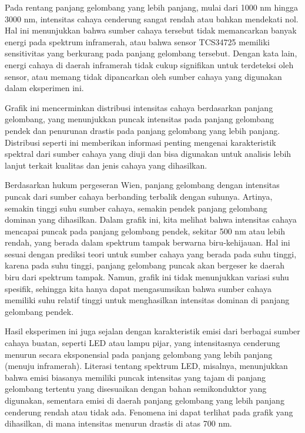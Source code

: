 Pada rentang panjang gelombang yang lebih panjang, mulai dari 1000 nm hingga 3000 nm, intensitas cahaya cenderung sangat rendah atau bahkan mendekati nol. Hal ini menunjukkan bahwa sumber cahaya tersebut tidak memancarkan banyak energi pada spektrum inframerah, atau bahwa sensor TCS34725 memiliki sensitivitas yang berkurang pada panjang gelombang tersebut. Dengan kata lain, energi cahaya di daerah inframerah tidak cukup signifikan untuk terdeteksi oleh sensor, atau memang tidak dipancarkan oleh sumber cahaya yang digunakan dalam eksperimen ini.

Grafik ini mencerminkan distribusi intensitas cahaya berdasarkan panjang gelombang, yang menunjukkan puncak intensitas pada panjang gelombang pendek dan penurunan drastis pada panjang gelombang yang lebih panjang. Distribusi seperti ini memberikan informasi penting mengenai karakteristik spektral dari sumber cahaya yang diuji dan bisa digunakan untuk analisis lebih lanjut terkait kualitas dan jenis cahaya yang dihasilkan.

Berdasarkan hukum pergeseran Wien, panjang gelombang dengan intensitas puncak dari sumber cahaya berbanding terbalik dengan suhunya. Artinya, semakin tinggi suhu sumber cahaya, semakin pendek panjang gelombang dominan yang dihasilkan. Dalam grafik ini, kita melihat bahwa intensitas cahaya mencapai puncak pada panjang gelombang pendek, sekitar 500 nm atau lebih rendah, yang berada dalam spektrum tampak berwarna biru-kehijauan. Hal ini sesuai dengan prediksi teori untuk sumber cahaya yang berada pada suhu tinggi, karena pada suhu tinggi, panjang gelombang puncak akan bergeser ke daerah biru dari spektrum tampak. Namun, grafik ini tidak menunjukkan variasi suhu spesifik, sehingga kita hanya dapat mengasumsikan bahwa sumber cahaya memiliki suhu relatif tinggi untuk menghasilkan intensitas dominan di panjang gelombang pendek.

Hasil eksperimen ini juga sejalan dengan karakteristik emisi dari berbagai sumber cahaya buatan, seperti LED atau lampu pijar, yang intensitasnya cenderung menurun secara eksponensial pada panjang gelombang yang lebih panjang (menuju inframerah). Literasi tentang spektrum LED, misalnya, menunjukkan bahwa emisi biasanya memiliki puncak intensitas yang tajam di panjang gelombang tertentu yang disesuaikan dengan bahan semikonduktor yang digunakan, sementara emisi di daerah panjang gelombang yang lebih panjang cenderung rendah atau tidak ada. Fenomena ini dapat terlihat pada grafik yang dihasilkan, di mana intensitas menurun drastis di atas 700 nm.

